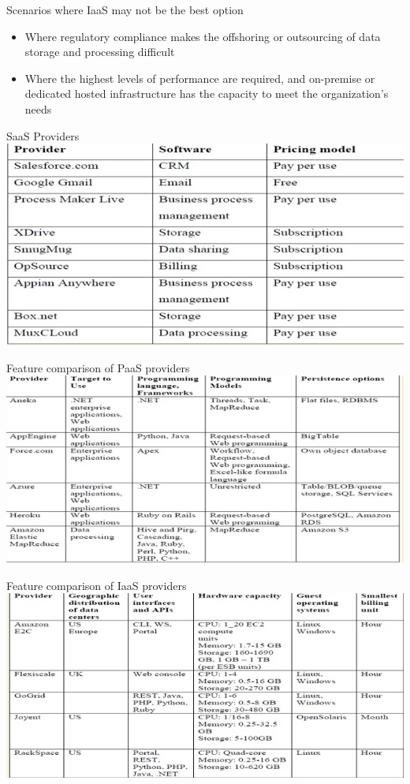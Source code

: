 \documentclass{SKP-beamer}
\begin{document}
 
 \begin{frame}{Scenarios where IaaS may not be the best option}
 	\begin{itemize}
 		\item Where regulatory compliance makes the offshoring or outsourcing of data storage and processing difficult
 		\item Where the highest levels of performance are required, and on-premise or dedicated hosted infrastructure has the capacity to meet the organization’s needs		 		 		
 	\end{itemize}
 \end{frame}
 
 \begin{frame}{SaaS Providers}
 	\includegraphics[scale=0.7]{v.png}
 \end{frame}
 
 \begin{frame}{Feature comparison of PaaS providers}
 	\includegraphics[scale=0.7]{w.png}
 \end{frame}
 
 \begin{frame}{Feature comparison of IaaS providers}
 	\includegraphics[scale=0.7]{x.png}
 \end{frame}
 
\end{document}
